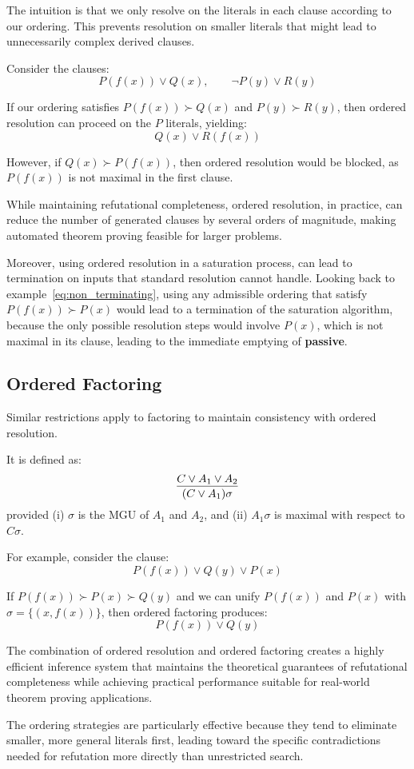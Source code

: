 \noindent The intuition is that we only resolve on the  literals in each clause according to our ordering. This prevents resolution on smaller literals that might lead to unnecessarily complex derived clauses.

Consider the clauses:
\[P(f(x)) \lor Q(x), \qquad \neg P(y) \lor R(y)\]

If our ordering satisfies \(P(f(x)) \succ Q(x)\) and \(P(y) \succ R(y)\), then ordered resolution can proceed on the \(P\) literals, yielding:
\[Q(x) \lor R(f(x))\]

However, if \(Q(x) \succ P(f(x))\), then ordered resolution would be blocked, as \(P(f(x))\) is not maximal in the first clause.

While maintaining refutational completeness, ordered resolution, in practice, can reduce the number of generated clauses by several orders of magnitude, making automated theorem proving feasible for larger problems.

Moreover, using ordered resolution in a saturation process, can lead to termination on inputs that standard resolution cannot handle.
Looking back to example~\ref{eq:non_terminating}, using any admissible ordering that satisfy \(P(f(x)) \succ P(x)\) would lead to a termination of the saturation algorithm, because the only possible resolution steps would involve \(P(x)\), which is not maximal in its clause, leading to the immediate emptying of \textbf{passive}.

\subsection{Ordered Factoring}

Similar restrictions apply to factoring to maintain consistency with ordered resolution.

It is defined as:
\begin{equation}
  \infer{(C \lor A_1)\sigma}{C \lor A_1 \lor A_2}
\end{equation}
\indent provided (i) \(\sigma\) is the MGU of \(A_1\) and \(A_2\), and (ii) \(A_1\sigma\) is maximal with respect to \(C\sigma\).

\noindent For example, consider the clause:
\[P(f(x)) \lor Q(y) \lor P(x)\]

If \(P(f(x)) \succ P(x) \succ Q(y)\) and we can unify \(P(f(x))\) and \(P(x)\) with \(\sigma = \{(x , f(x))\}\), then ordered factoring produces:
\[P(f(x)) \lor Q(y)\]

The combination of ordered resolution and ordered factoring creates a highly efficient inference system that maintains the theoretical guarantees of refutational completeness while achieving practical performance suitable for real-world theorem proving applications.

The ordering strategies are particularly effective because they tend to eliminate smaller, more general literals first, leading toward the specific contradictions needed for refutation more directly than unrestricted search.


